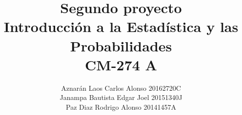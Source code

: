 \titlehead{%
	\centering\hspace*{-0.55cm}\texttt{[image: 1]}
}
\theoremstyle{definition}
\newtheorem{definition}{Definición}
\newtheorem{theorem}{Teorema}
\newtheorem{corollary}{Corolario}

\usepackage{xpatch}
\makeatletter
{}
\makeatother

\author{
	Aznarán Laos Carlos Alonso	\quad\hfill 20162720C\\
	Janampa Bautista Edgar Joel		\quad\hfill 20151340J\\
	Paz Diaz Rodrigo Alonso	\quad\hfill 20141457A\\
}

\title{Segundo proyecto\\
	Introducción a la Estadística y las Probabilidades\\
	CM-274 A}



\settitle
